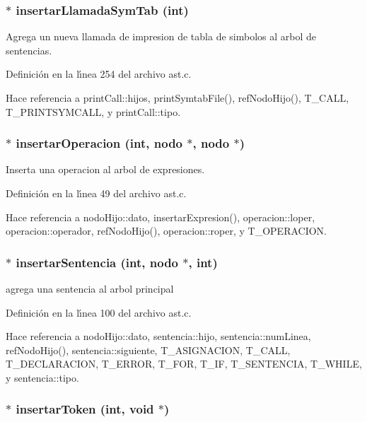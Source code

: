 \subsubsection{$\ast$ insertar\-Llamada\-Sym\-Tab (int)}\label{ast_8h_a30}


Agrega un nueva llamada de impresion de tabla de simbolos al arbol de sentencias. 



Definici\'{o}n en la l\'{\i}nea 254 del archivo ast.c.

Hace referencia a print\-Call::hijos, print\-Symtab\-File(), ref\-Nodo\-Hijo(), T\_\-CALL, T\_\-PRINTSYMCALL, y print\-Call::tipo.
\subsubsection{$\ast$ insertar\-Operacion (int, {\bf nodo} $\ast$, {\bf nodo} $\ast$)}\label{ast_8h_a20}


Inserta una operacion al arbol de expresiones. 



Definici\'{o}n en la l\'{\i}nea 49 del archivo ast.c.

Hace referencia a nodo\-Hijo::dato, insertar\-Expresion(), operacion::loper, operacion::operador, ref\-Nodo\-Hijo(), operacion::roper, y T\_\-OPERACION.
\subsubsection{$\ast$ insertar\-Sentencia (int, {\bf nodo} $\ast$, int)}\label{ast_8h_a23}


agrega una sentencia al arbol principal 



Definici\'{o}n en la l\'{\i}nea 100 del archivo ast.c.

Hace referencia a nodo\-Hijo::dato, sentencia::hijo, sentencia::num\-Linea, ref\-Nodo\-Hijo(), sentencia::siguiente, T\_\-ASIGNACION, T\_\-CALL, T\_\-DECLARACION, T\_\-ERROR, T\_\-FOR, T\_\-IF, T\_\-SENTENCIA, T\_\-WHILE, y sentencia::tipo.
\subsubsection{$\ast$ insertar\-Token (int, void $\ast$)}\label{ast_8h_a28}


